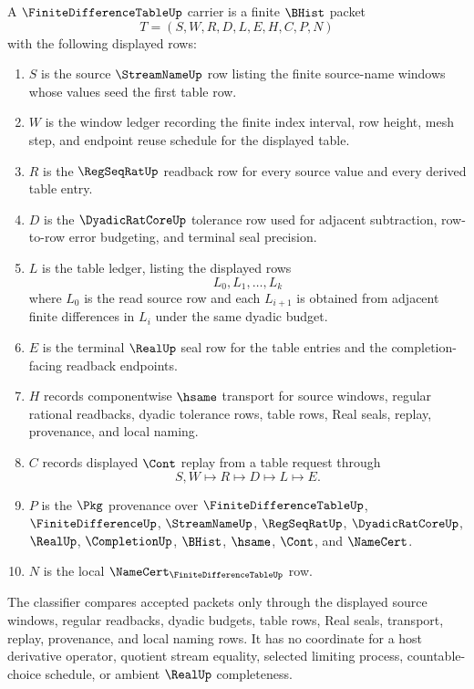 \begin{definition}
\label{def:finite-difference-table-carrier}
A $\FiniteDifferenceTableUp$ carrier is a finite $\BHist$ packet
$$
T=(S,W,R,D,L,E,H,C,P,N)
$$
with the following displayed rows:
\begin{enumerate}
\item $S$ is the source $\StreamNameUp$ row listing the finite source-name windows whose values seed the first table row.
\item $W$ is the window ledger recording the finite index interval, row height, mesh step, and endpoint reuse schedule for the displayed table.
\item $R$ is the $\RegSeqRatUp$ readback row for every source value and every derived table entry.
\item $D$ is the $\DyadicRatCoreUp$ tolerance row used for adjacent subtraction, row-to-row error budgeting, and terminal seal precision.
\item $L$ is the table ledger, listing the displayed rows
$$
L_0,L_1,\ldots,L_k
$$
where $L_0$ is the read source row and each $L_{i+1}$ is obtained from adjacent finite differences in $L_i$ under the same dyadic budget.
\item $E$ is the terminal $\RealUp$ seal row for the table entries and the completion-facing readback endpoints.
\item $H$ records componentwise $\hsame$ transport for source windows, regular rational readbacks, dyadic tolerance rows, table rows, Real seals, replay, provenance, and local naming.
\item $C$ records displayed $\Cont$ replay from a table request through
$$
S,W \longmapsto R \longmapsto D \longmapsto L \longmapsto E .
$$
\item $P$ is the $\Pkg$ provenance over $\FiniteDifferenceTableUp$, $\FiniteDifferenceUp$, $\StreamNameUp$, $\RegSeqRatUp$, $\DyadicRatCoreUp$, $\RealUp$, $\CompletionUp$, $\BHist$, $\hsame$, $\Cont$, and $\NameCert$.
\item $N$ is the local $\NameCert_{\FiniteDifferenceTableUp}$ row.
\end{enumerate}
The classifier compares accepted packets only through the displayed source windows, regular readbacks, dyadic budgets, table rows, Real seals, transport, replay, provenance, and local naming rows. It has no coordinate for a host derivative operator, quotient stream equality, selected limiting process, countable-choice schedule, or ambient $\RealUp$ completeness.
\end{definition}

